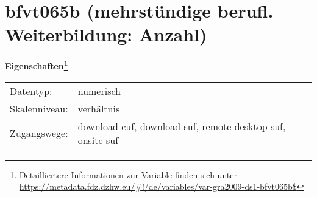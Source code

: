 
    \setcounter{footnote}{0}

    \vspace*{-1.8cm}
	\section{bfvt065b (mehrstündige berufl. Weiterbildung: Anzahl)}
	\label{section:bfvt065b}



    \vspace*{0.5cm}
    \noindent\textbf{Eigenschaften\footnote{Detailliertere Informationen zur Variable finden sich unter
		\url{https://metadata.fdz.dzhw.eu/\#!/de/variables/var-gra2009-ds1-bfvt065b$}}}\\
	\begin{tabularx}{\hsize}{@{}lX}
	Datentyp: & numerisch \\
	Skalenniveau: & verhältnis \\
	Zugangswege: &
	  download-cuf, 
	  download-suf, 
	  remote-desktop-suf, 
	  onsite-suf
 \\
    \end{tabularx}



